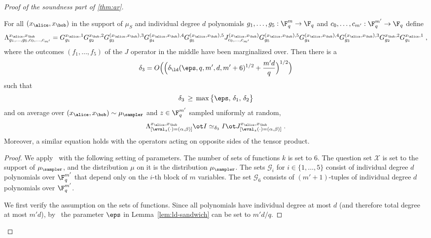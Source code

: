 \begin{proof}[Proof of the soundness part of \cref{thm:ar}]
	\begin{claim}\label{claim:ar-5}
    For all $(x_\alice,x_\bob)$ in the support of $\mu_S$ and individual degree $d$
    polynomials $g_1,\ldots,g_5:\F_q^m\to \F_q$ and $c_0,\ldots,c_{m'}:\F_q^{m'}
    \to \F_q$ define
    \begin{equation}
      \Lambda^{{x}_\alice, {x}_\bob}_{ g_1, \dots, g_5, c_0, \dots, c_{m'}} =
      G^{{x}_\alice, 1}_{g_1} G^{{x}_\bob, 2}_{g_2} G^{({x}_\alice, {x}_\bob),
        3}_{g_3} G^{({x}_\alice,{x}_\bob),4}_{g_4} G^{({x}_\alice, {x}_\bob),5}_{g_5} J^{({x}_\alice, {x}_\bob)}_{c_0,
        \dots, c_{m'}} G^{({x}_\alice, {x}_\bob), 5}_{g_5}
      G^{({x}_\alice,{x}_\bob),4}_{g_4}
      G^{({x}_\alice, {x}_\bob), 3}_{g_3} G^{x_\bob,2}_{g_2} G^{{x}_\alice,1}_{g_1}\;,
      \label{eq:lambda-giant-sandwich}
    \end{equation}
    where the outcomes $(f_1,\ldots,f_5)$ of the $J$ operator in the middle have
    been marginalized over.
    Then there is a
    \[\delta_3 = O\Big(\Big(\delta_{\ld}({\eps}, q, m', d,
      m'+6)^{1/2}+ \frac{m'd}{q}\Big)^{1/2}\Big)\]
such that
    \[ \delta_3 \,\geq\, \max\big\{ \eps, \,\delta_1,\,\delta_2\big\}\]
    and on average over $({x}_\alice, {x}_\bob) \sim
    \mu_{\sampler}$ and $z\in \F_q^{m'}$ sampled uniformly at random,
    \begin{equation}
      \Lambda^{{x}_\alice, {x}_\bob}_{[\eval_{z}(\cdot) = ( \alpha, \beta)]} \ot I
      \simeq_{\delta_3} I \ot J^{{x}_\alice, {x}_\bob}_{[\eval_{z}(\cdot)
        = ( \alpha, \beta)]}\;.
    \label{eq:lambda-consistent}
  \end{equation}
	Moreover, a similar equation holds with the operators acting on opposite sides
  of the tensor product.

\end{claim}
	\begin{proof}
    We apply~ with the following setting of parameters.
    The number of sets of functions $k$ is set to $6$.
    The question set $\mathcal{X}$ is set to the support of $\mu_\sampler$, and
    the distribution $\mu$ on it is the distribution $\mu_\sampler$.
    The sets $\mathcal{G}_i$ for $i \in \{1, \dots, 5\}$ consist of individual
    degree $d$ polynomials over $\F_q^{m'}$ that depend only on the $i$-th block
    of $m$ variables.
    The set $\mathcal{G}_6$ consists of $(m' + 1)$-tuples of individual degree
    $d$ polynomials over $\F_q^{m'}$.

    We first verify the assumption on the sets of functions.
    Since all polynomials have individual degree at most $d$ (and therefore
    total degree at most $m'd$), by~ the parameter
    $\eps$ in Lemma~\ref{lem:ld-sandwich} can be set to $m'd/q$.


\end{proof}
\end{proof}
